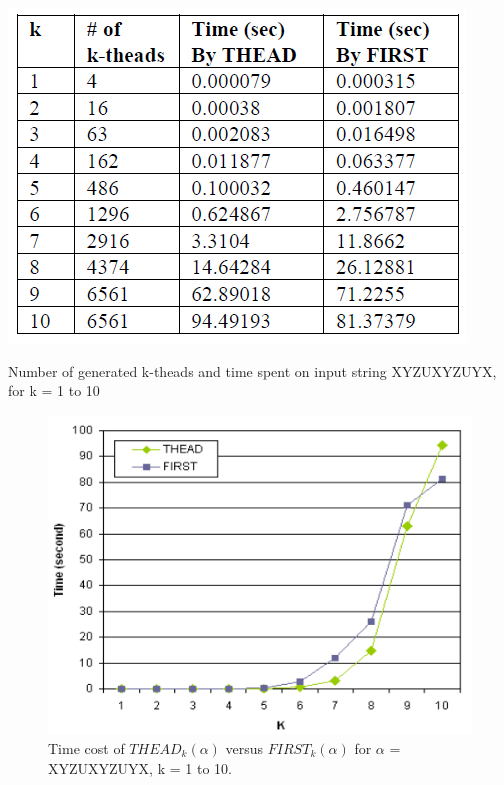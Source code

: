\documentclass{sig-alternate-05-2015}
\begin{document}
\begin{table}
\centering
\includegraphics[scale=0.5]{table5.PNG}
\caption{Number of generated k-theads and time spent on
input string XYZUXYZUYX, for k = 1 to 10}
\label{table:5}
\end{table}

\begin{figure}
\centering
\includegraphics[scale=0.5]{figure4.PNG}
\caption{Time cost of $THEAD_k(\alpha)$ versus $FIRST_k(\alpha)$
for $\alpha$ = XYZUXYZUYX, k = 1 to 10.}
\label{fig:4}
\end{figure}
\end{document}
